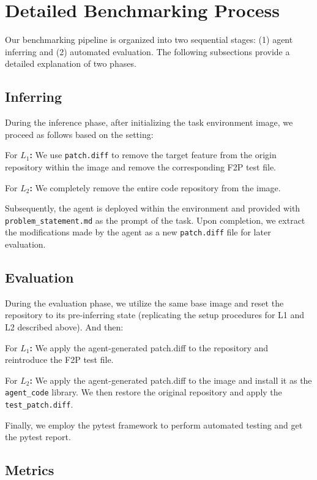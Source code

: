 \documentclass{article}
\begin{document}
\section{Detailed Benchmarking Process} 

Our benchmarking pipeline is organized into two sequential stages: (1) agent inferring and (2) automated evaluation.  The following subsections provide a detailed explanation of two phases.

\subsection{Inferring}

During the inference phase, after initializing the task environment image, we proceed as follows based on the setting:

For \textbf{$L_1$:} We use \texttt{patch.diff} to remove the target feature from the origin repository within the image and remove the corresponding F2P test file.

For \textbf{$L_2$:} We completely remove the entire code repository from the image.

Subsequently, the agent is deployed within the environment and provided with \texttt{problem\_statement.md} as the prompt of the task. Upon completion, we extract the modifications made by the agent as a new \texttt{patch.diff} file for later evaluation.

\subsection{Evaluation}

During the evaluation phase, we utilize the same base image and reset the repository to its pre-inferring state (replicating the setup procedures for L1 and L2 described above). And then:

For \textbf{$L_1$:} We apply the agent-generated patch.diff to the repository and reintroduce the F2P test file.

For \textbf{$L_2$:} We apply the agent-generated patch.diff to the image and install it as the \texttt{agent\_code} library. We then restore the original repository and apply the \texttt{test\_patch.diff}.

Finally, we employ the pytest framework to perform automated testing and get the pytest report.

\subsection{Metrics}
\end{document}
